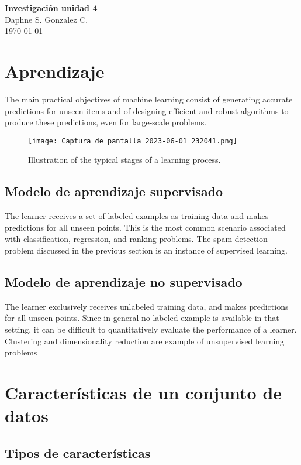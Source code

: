 \documentclass[12pt,a4paper, brazil]{article}
\begin{document}
\begin{center}
{\textbf {\huge Investigación unidad 4}}\\[5mm]
{\large Daphne S. Gonzalez C.} \\[5mm]
\today\\[5mm] %
\end{center}


\section{Aprendizaje}
The main practical objectives of machine learning consist of generating accurate predictions for unseen items and of designing efficient and robust algorithms to produce these predictions, even for large-scale problems. \textcite{Mohri2018-lf,}
    \begin{figure}[h]
        \centering
        \texttt{[image: Captura de pantalla 2023-06-01 232041.png]}
        \caption{Illustration of the typical stages of a learning process.}
        \label{fig:exemplo}
    \end{figure}
\subsection{Modelo de aprendizaje supervisado}
The learner receives a set of labeled examples as training data and makes predictions for all unseen points. This is the most common scenario associated with classification, regression, and ranking problems. The spam detection problem discussed in the previous section is an instance of supervised learning.

\subsection{Modelo de aprendizaje no supervisado}
The learner exclusively receives unlabeled training data, and makes predictions for all unseen points. Since in general no labeled example is available in that setting, it can be difficult to quantitatively evaluate the performance of a learner. Clustering and dimensionality reduction are example of unsupervised learning problems

\section{Características de un conjunto de datos}
    \subsection{Tipos de características}
    
\end{document}
